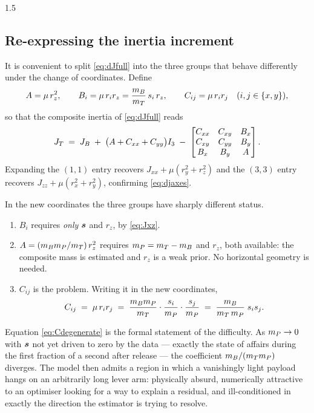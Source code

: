 \begin{spacing}{1.5}
\subsection{Re-expressing the inertia increment}\label{sec:model:Jofs}

It is convenient to split \eqref{eq:dJfull} into the three groups that behave
differently under the change of coordinates. Define
\begin{equation}
A = \mu\, r_z^2, \qquad
B_i = \mu\, r_i r_z = \frac{m_B}{m_T}\, s_i\, r_z, \qquad
C_{ij} = \mu\, r_i r_j \quad (i,j\in\{x,y\}),
\label{eq:ABC}
\end{equation}
so that the composite inertia of \eqref{eq:dJfull} reads
\begin{equation}
J_T \;=\; J_B \;+\; \bigl(A + C_{xx} + C_{yy}\bigr) I_3
\;-\;
\begin{bmatrix}
C_{xx} & C_{xy} & B_x \\
C_{xy} & C_{yy} & B_y \\
B_x    & B_y    & A
\end{bmatrix}.
\label{eq:JABC}
\end{equation}
Expanding the $(1,1)$ entry recovers $J_{xx}+\mu(r_y^2+r_z^2)$ and the $(3,3)$
entry recovers $J_{zz}+\mu(r_x^2+r_y^2)$, confirming \eqref{eq:djaxes}.

In the new coordinates the three groups have sharply different status.
\begin{enumerate}
\item $B_i$ requires \emph{only} $\bm{s}$ and $r_z$, by \eqref{eq:Jxz}.
\item $A = (m_Bm_P/m_T)\,r_z^2$ requires $m_P = m_T-m_B$ and $r_z$, both
available: the composite mass is estimated and $r_z$ is a weak prior. No
horizontal geometry is needed.
\item $C_{ij}$ is the problem. Writing it in the new coordinates,
\begin{equation}
C_{ij} \;=\; \mu\, r_i r_j
\;=\; \frac{m_B m_P}{m_T}\cdot\frac{s_i}{m_P}\cdot\frac{s_j}{m_P}
\;=\; \frac{m_B}{m_T\,m_P}\; s_i s_j .
\label{eq:Cdegenerate}
\end{equation}
\end{enumerate}

Equation \eqref{eq:Cdegenerate} is the formal statement of the difficulty. As
$m_P\to0$ with $\bm{s}$ not yet driven to zero by the data --- exactly the state
of affairs during the first fraction of a second after release --- the
coefficient $m_B/(m_Tm_P)$ diverges. The model then admits a region in which a
vanishingly light payload hangs on an arbitrarily long lever arm: physically
absurd, numerically attractive to an optimiser looking for a way to explain a
residual, and ill-conditioned in exactly the direction the estimator is trying to
resolve.


\end{spacing}
